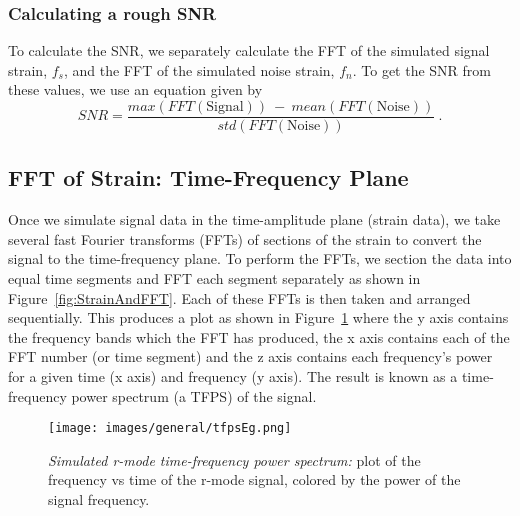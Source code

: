 \documentclass[%
reprint,
amsmath,amssymb,
aps,
]{revtex4-1}
\begin{document}
	\subsubsection{Calculating a rough SNR}
	To calculate the SNR, we separately calculate the FFT of the simulated signal strain, $f_s$, and the FFT of the simulated noise strain, $f_n$. To get the SNR from these values, we use an equation given by 
	\begin{equation} \label{eq:inputSNR}
	SNR = \frac{max(FFT(\text{Signal}))\ - \ mean(FFT(\text{Noise}))}{std(FFT(\text{Noise}))} \ .
	\end{equation}
	
	\subsection{FFT of Strain: Time-Frequency Plane}
	Once we simulate signal data in the time-amplitude plane (strain data), we take several fast Fourier transforms (FFTs) of sections of the strain to convert the signal to the time-frequency plane. To perform the FFTs, we section the data into equal time segments and FFT each segment separately as shown in Figure~\ref{fig:StrainAndFFT}. Each of these FFTs is then taken and arranged sequentially. This produces a plot as shown in Figure~\ref{fig:tfpsEg} where the y axis contains the frequency bands which the FFT has produced, the x axis contains each of the FFT number (or time segment) and the z axis contains each frequency's power for a given time (x axis) and frequency (y axis). The result is known as a time-frequency power spectrum (a TFPS)  of the signal. 
	
	\begin{figure}[h]
		\centering
		\texttt{[image: images/general/tfpsEg.png]}
		\caption{\textit{Simulated r-mode time-frequency power spectrum:} plot of the frequency vs time of the r-mode signal, colored by the power of the signal frequency.}
		\label{fig:tfpsEg}
	\end{figure}
	
	
\end{document}
